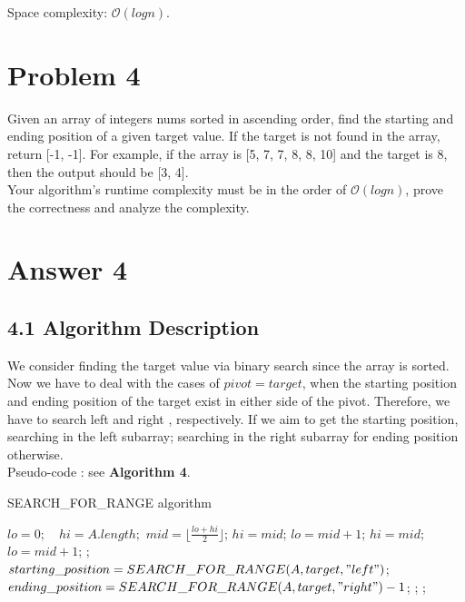 \documentclass[UTF8]{ctexart}
\begin{document}
Space complexity: $\mathcal{O}(logn)$.
\section*{Problem 4}
Given an array of integers nums sorted in ascending order, find the starting and ending
position of a given target value. If the target is not found in the array, return [-1, -1]. For
example, if the array is [5, 7, 7, 8, 8, 10] and the target is 8, then the output should be [3, 4].\\
Your algorithm's runtime complexity must be in the order of $\mathcal{O}(log n)$, prove the correctness
and analyze the complexity.

\section*{Answer 4}
\subsection*{4.1 Algorithm Description}
We consider finding the target value via binary search since the array is sorted. Now we have to deal with the cases of
$pivot = target$, when the starting position and ending position of the target exist in either side of the pivot. Therefore, we have to search left and right 
, respectively. If we aim to get the starting position, searching in the left subarray; searching in the right subarray for ending position otherwise.\\

Pseudo-code : see \textbf{Algorithm 4}. 

\begin{algorithm}[h]
	\caption{SEARCH\_FOR\_RANGE algorithm}
	\begin{algorithmic}[1]
		\State $lo = 0;\quad hi = A.length;$ 
			\State $mid = \lfloor \frac{lo+hi}{2}\rfloor$;
				\State $hi = mid$;
			\Else
				\State $lo = mid + 1$;
			\EndIf
					\State $hi = mid;$
				\Else  
					\State $lo = mid + 1$;
				\EndIf
			\EndIf
		\EndWhile
		\State {} ;
	\EndFunction
		\State $starting\_position = SEARCH\_FOR\_RANGE(A, target, "left")$;
		\State $ending\_position = SEARCH\_FOR\_RANGE(A, target, "right") - 1 $;
			\State \Return{$[-1, -1]$};
		\Else
			\State {};
		\EndIf
	\EndFunction
	\end{algorithmic}
\end{algorithm}
\end{document}
